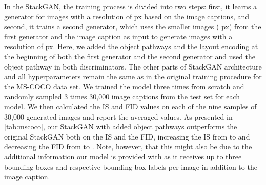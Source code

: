\documentclass{article} \usepackage{iclr2019_conference,times}
\begin{document}
	In the StackGAN, the training process is divided into two steps: first, it learns a generator for images with a resolution of  px based on the image captions, and second, it trains a second generator, which uses the smaller images ( px) from the first generator and the image caption as input to generate images with a resolution of  px.
	Here, we added the object pathways and the layout encoding at the beginning of both the first generator and the second generator and used the object pathway in both discriminators.
	The other parts of StackGAN architecture and all hyperparameters remain the same as in the original training procedure for the MS-COCO data set.
	We trained the model three times from scratch and randomly sampled 3 times 30,000 image captions from the test set for each model.
	We then calculated the IS and FID values on each of the nine samples of 30,000 generated images and report the averaged values.
	As presented in \autoref{tab:mscoco}, our StackGAN with added object pathways outperforms the original StackGAN both on the IS and the FID, increasing the IS from  to  and decreasing the FID from  to .
	Note, however, that this might also be due to the additional information our model is provided with as it receives up to three bounding boxes and respective bounding box labels per image in addition to the image caption.
\end{document}
